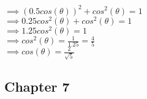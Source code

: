 \begin{enumerate}
\tab $\implies (0.5cos(\theta))^2 + cos^2(\theta) = 1$\\

\tab $\implies 0.25cos^2(\theta) + cos^2(\theta) = 1$\\

\tab $\implies 1.25cos^2(\theta) = 1$\\

\tab $\implies cos^2(\theta) = \frac{1}{1.25} = \frac{4}{5}$\\

\tab $\implies cos(\theta) = \frac{2}{\sqrt{5}}$\\

\end{enumerate}












\clearpage
\subsection{Chapter 7}

